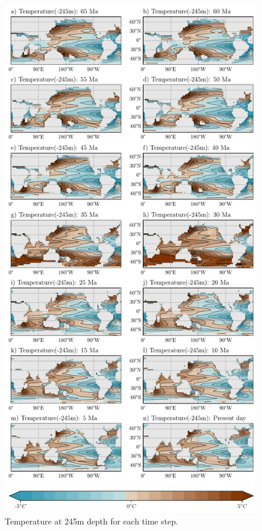 \documentclass[a4paper]{article}
\begin{document}
\begin{figure}[H]
	\centering
	\includegraphics[width=0.7\linewidth]{full_sst.pdf}
	\caption{Temperature at 245m depth for each time step.}
	\label{fig:sst_total}
\end{figure}
\end{document}
